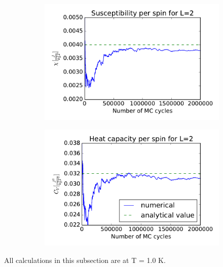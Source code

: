 	\begin{figure}[H]
		\begin{subfigure}[b]{0.49\textwidth}
	\includegraphics[width=1\linewidth]{../results/4b/L_2_susceptibility}
\caption{}
\label{fig:l2susceptibility}
		\end{subfigure}
		\hfill
		\begin{subfigure}[b]{0.49\textwidth}
		\includegraphics[width=1\linewidth]{../results/4b/L_2_heat_capasity}
\caption{}
\label{fig:l2heatcapasity}
		\end{subfigure}
		\caption{}
	\end{figure}



All calculations in this subsection are at T = 1.0 K. 

